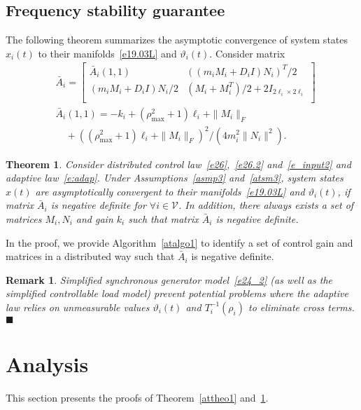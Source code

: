 \documentclass[journal]{IEEEtran}
\newcommand{\nnum}{\nonumber}
\newcommand{\VV}{{\mathcal{V}}}
\newtheorem{theorem}{\bf Theorem}[section]
\newtheorem{remark}{\bf Remark}[section]
\newcommand\oprocendsymbol{\hbox{$\blacksquare$}}
\newcommand\oprocend{\relax\ifmmode\else\unskip\hfill\fi\oprocendsymbol}
\begin{document}
\subsection{Frequency stability guarantee}\label{sec:stab2}
The following theorem summarizes the asymptotic convergence of system states $x_{i}(t)$ to their manifolds~\eqref{e19.03L} and $\vartheta_i(t)$.
Consider matrix
\begin{align}
&\bar{A}_i=
\left[
\begin{array}{ccc}
\bar{A}_i(1,1)&((m_iM_i+D_i I) N_i)^T/2\\
(m_iM_i+D_i I) N_i/2&(M_i+M_i^T)/2+2I_{2\ell_i \times 2\ell_i}\\
\end{array}
\right]\nnum\\
&\bar{A}_i(1,1)=-k_{i}+(\rho_{\max}^2+1) \ell_i + \|M_i\|_F\nnum\\
&\quad +((\rho_{\max}^2+1) \ell_i + \|M_i\|_F)^2/(4m_i^2\|N_i\|^2).
\label{eq:A2}
\end{align}

\begin{theorem}
Consider distributed control law~\eqref{e26},~\eqref{e26.2} and~\eqref{e_input2} and adaptive law~\eqref{e:adap}. Under Assumptions~\ref{asmp3} and~\ref{atsm3}, system states $x(t)$ are asymptotically convergent to their manifolds~\eqref{e19.03L} and $\vartheta_i(t)$, if matrix $\bar{A}_i$ is negative definite for $\forall i \in {\VV}$.
In addition, there always exists a set of matrices $M_i,N_i$ and gain $k_{i}$ such that matrix $\bar{A}_i$ is negative definite.
\label{attheo2}
\end{theorem}

In the proof, we provide Algorithm~\ref{atalgo1} to identify a set of control gain and matrices in a distributed way such that $\bar{A}_i$ is negative definite.

\begin{remark}
Simplified synchronous generator model~\eqref{e24_2} (as well as the simplified controllable load model) prevent potential problems where the adaptive law relies on unmeasurable values $\vartheta_i(t)$ and $T_i^{-1}(\rho_i)$ to eliminate cross terms.
\oprocend
\label{rem:sec5}
\end{remark}

\section{Analysis}
This section presents the proofs of Theorem~\ref{attheo1} and~\ref{attheo2}.
\end{document}

